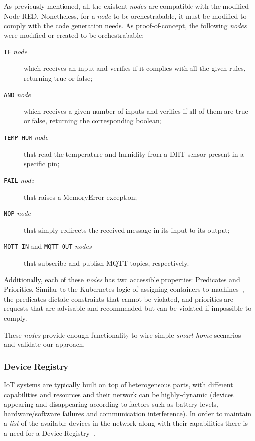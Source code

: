 As previously mentioned, all the existent \textit{nodes} are compatible with the modified Node-RED. Nonetheless, for a \textit{node} to be orchestrabable, it must be modified to comply with the code generation needs. As proof-of-concept, the following \textit{nodes} were modified or created to be orchestrabable:
\begin{description}
    \item[\texttt{IF} \textit{node}] which receives an input and verifies if it complies with all the given rules, returning true or false;
    \item[\texttt{AND} \textit{node}] which receives a given number of inputs and verifies if all of them are true or false, returning the corresponding boolean;
    \item[\texttt{TEMP-HUM} \textit{node}] that read the temperature and humidity from a DHT sensor present in a specific pin;
    \item[\texttt{FAIL} \textit{node}] that raises a MemoryError exception;
    \item[\texttt{NOP} \textit{node}] that simply redirects the received message in its input to its output;
    \item[\texttt{MQTT IN} and \texttt{MQTT OUT} \textit{nodes}] that subscribe and publish MQTT topics, respectively.
\end{description}

Additionally, each of these \textit{nodes} has two accessible properties: Predicates and Priorities. Similar to the Kubernetes logic of assigning containers to machines~\cite{burns2018managing}, the predicates dictate constraints that cannot be violated, and priorities are requests that are advisable and recommended but can be violated if impossible to comply. 

These \textit{nodes} provide enough functionality to wire simple \textit{smart home} scenarios and validate our approach.

\subsubsection{Device Registry}
\label{sec:registry}

IoT systems are typically built on top of heterogeneous parts, with different capabilities and resources and their network can be highly-dynamic (devices appearing and disappearing according to factors such as battery levels, hardware/software failures and communication interference). In order to maintain a \textit{list} of the available devices in the network along with their capabilities there is a need for a Device Registry~\cite{Ramadas17}.

